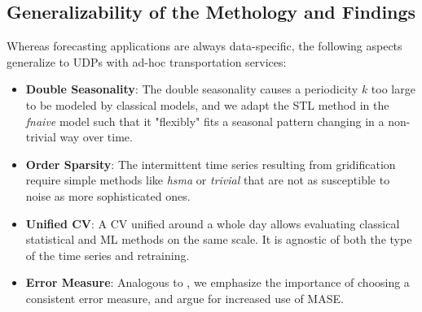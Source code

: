 \subsection{Generalizability of the Methology and Findings}
\label{generalizability}

Whereas forecasting applications are always data-specific, the following
    aspects generalize to UDPs with ad-hoc transportation services:
\begin{itemize}
\item \textbf{Double Seasonality}:
The double seasonality causes a periodicity $k$ too large to be modeled by
    classical models, and we adapt the STL method in the \textit{fnaive} model
    such that it "flexibly" fits a seasonal pattern changing in a non-trivial
    way over time.
\item \textbf{Order Sparsity}:
The intermittent time series resulting from gridification require simple
    methods like \textit{hsma} or \textit{trivial} that are not as susceptible
    to noise as more sophisticated ones.
\item \textbf{Unified CV}:
A CV unified around a whole day allows evaluating classical statistical and ML
    methods on the same scale.
It is agnostic of both the type of the time series and retraining.
\item \textbf{Error Measure}:
Analogous to \cite{hyndman2006}, we emphasize the importance of choosing a
    consistent error measure, and argue for increased use of MASE.
\end{itemize}
